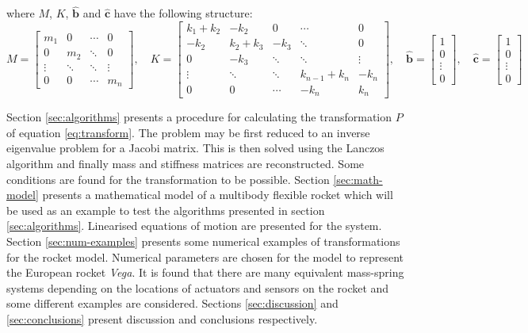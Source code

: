 \documentclass{mbd_fullpaper}
\begin{document}
where $M$, $K$, $\mathbf{\hat{b}}$ and $\mathbf{\hat{c}}$ have the following structure:
\begin{equation}
M = \begin{bmatrix}
m_1  &  0 & \cdots & 0 \\
0 & m_2  & \ddots & 0 \\
\vdots & \ddots & \ddots & \vdots \\
0 & 0 & \cdots & m_n \end{bmatrix}
, \quad
K = \begin{bmatrix}
k_1+k_2  &  -k_2 & 0 & \cdots & 0 \\
-k_2 & k_2+k_3  & -k_3 & \ddots & 0 \\
0 & -k_3 & \ddots & \ddots & \vdots \\
\vdots & \ddots & \ddots & k_{n-1}+k_n & -k_{n} \\
0 & 0 & \cdots & -k_{n} & k_n \end{bmatrix}
,\quad \mathbf{\hat{b}} = \begin{bmatrix} 1 \\ 0 \\ \vdots \\ 0 \end{bmatrix}
,\quad \mathbf{\hat{c}} = \begin{bmatrix} 1 \\ 0 \\ \vdots \\ 0 \end{bmatrix}
\label{eq:ms3}
\end{equation}

Section \ref{sec:algorithms} presents a procedure for calculating the transformation $P$ of equation \ref{eq:transform}.
The problem may be first reduced to an inverse eigenvalue problem for a Jacobi matrix.
This is then solved using the Lanczos algorithm and finally mass and stiffness matrices are reconstructed.
Some conditions are found for the transformation to be possible.
Section \ref{sec:math-model} presents a mathematical model of a multibody flexible rocket which will be used as an example to test the algorithms presented in section \ref{sec:algorithms}.
Linearised equations of motion are presented for the system.
Section \ref{sec:num-examples} presents some numerical examples of transformations for the rocket model.
Numerical parameters are chosen for the model to represent the European rocket \emph{Vega}.
It is found that there are many equivalent mass-spring systems depending on the locations of actuators and sensors on the rocket and some different examples are considered.
Sections \ref{sec:discussion} and \ref{sec:conclusions} present discussion and conclusions respectively.
\end{document}

